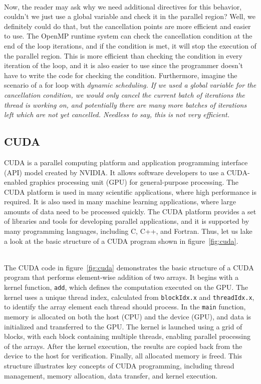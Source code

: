 \documentclass[../../main.tex]{subfiles}
\begin{document}
~\\
Now, the reader may ask why we need additional directives for this behavior, couldn't we just use a global variable and check it in the parallel region? Well, we definitely could do that, but the cancellation points are more efficient and easier to use. The OpenMP runtime system can check the cancellation condition at the end of the loop iterations, and if the condition is met, it will stop the execution of the parallel region. This is more efficient than checking the condition in every iteration of the loop, and it is also easier to use since the programmer doesn't have to write the code for checking the condition. Furthermore, imagine the scenario of a for loop with \em dynamic \em scheduling. If we used a global variable for the cancellation condition, we would only cancel the current batch of iterations the thread is working on, and potentially there are many more batches of iterations left which are not yet cancelled. Needless to say, this is not very efficient.

\bigskip
\subsection{CUDA}
CUDA is a parallel computing platform and application programming interface (API) model created by NVIDIA. It allows software developers to use a CUDA-enabled graphics processing unit (GPU) for general-purpose processing. The CUDA platform is used in many scientific applications, where high performance is required. It is also used in many machine learning applications, where large amounts of data need to be processed quickly. The CUDA platform provides a set of libraries and tools for developing parallel applications, and it is supported by many programming languages, including C, C++, and Fortran. Thus, let us lake a look at the basic structure of a CUDA program shown in figure~\ref{fig:cuda}.

~\\
The CUDA code in figure~\ref{fig:cuda} demonstrates the basic structure of a CUDA program that performs element-wise addition of two arrays. It begins with a kernel function, \texttt{add}, which defines the computation executed on the GPU. The kernel uses a unique thread index, calculated from \texttt{blockIdx.x} and \texttt{threadIdx.x}, to identify the array element each thread should process. In the \texttt{main} function, memory is allocated on both the host (CPU) and the device (GPU), and data is initialized and transferred to the GPU. The kernel is launched using a grid of blocks, with each block containing multiple threads, enabling parallel processing of the arrays. After the kernel execution, the results are copied back from the device to the host for verification. Finally, all allocated memory is freed. This structure illustrates key concepts of CUDA programming, including thread management, memory allocation, data transfer, and kernel execution.
\end{document}
